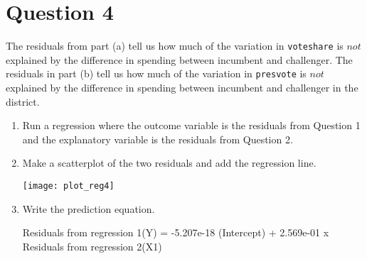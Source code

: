 \documentclass[12pt,letterpaper]{article}
\begin{document}
	
\section*{Question 4}%
\noindent The residuals from part (a) tell us how much of the variation in \texttt{voteshare} is $not$ explained by the difference in spending between incumbent and challenger. The residuals in part (b) tell us how much of the variation in \texttt{presvote} is $not$ explained by the difference in spending between incumbent and challenger in the district.
	\begin{enumerate}
		\item Run a regression where the outcome variable is the residuals from Question 1 and the explanatory variable is the residuals from Question 2.
		 

		\item Make a scatterplot of the two residuals and add the regression line. 	
		 		
		\texttt{[image: plot\_reg4]}
		
		\item Write the prediction equation.

\vspace{.5cm}
		Residuals from regression 1(Y) = -5.207e-18 (Intercept) + 2.569e-01 x Residuals from regression 2(X1)		
		
	\end{enumerate}
	
\end{document}
